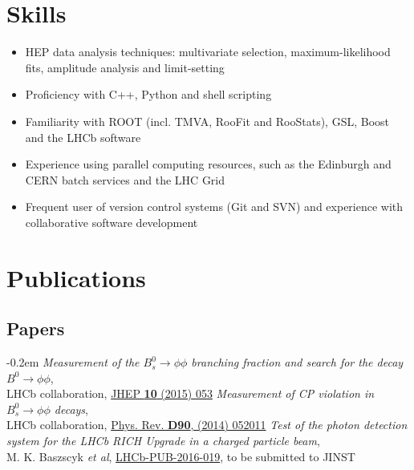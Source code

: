 \documentclass[contbibnum]{simplecv}
\renewcommand{\topicmargin}{8em}
\begin{document}
	\section{Skills}
	\begin{itemize}
		\itemsep-0.3em
		\item HEP data analysis techniques: multivariate selection, maximum-likelihood fits, amplitude analysis and limit-setting
		\item Proficiency with C++, Python and shell scripting
		\item Familiarity with ROOT (incl. TMVA, RooFit and RooStats), GSL, Boost and the LHCb software
		\item Experience using parallel computing resources, such as the Edinburgh and CERN batch services and the LHC Grid
		\item Frequent user of version control systems (Git and SVN) and experience with collaborative software development
	\end{itemize}
	\vspace{-1em}
	\section{Publications}
	\renewcommand{\topicmargin}{5em}
	\vspace{-0.5em}
	\subsection{Papers}
	\vspace{-0.5em}
	\begin{thebibliography}{1}
		\itemsep-0.2em
		\textit{Measurement of the $B^0_s \to \phi\phi$ branching fraction and search for the decay $B^0 \to \phi \phi$},\\LHCb collaboration, \href{http://dx.doi.org/10.1007/JHEP10(2015)053}{JHEP \textbf{10} (2015) 053}
		\textit{Measurement of CP violation in $B^0_s \to \phi\phi$ decays},\\LHCb collaboration, \href{http://dx.doi.org/10.1103/PhysRevD.90.052011}{Phys. Rev. \textbf{D90}, (2014) 052011}
		\textit{Test of the photon detection system for the LHCb RICH Upgrade in a charged particle beam},\\M. K. Baszscyk \textit{et al}, \href{http://cds.cern.ch/record/2197586}{LHCb-PUB-2016-019}, to be submitted to JINST
	\end{thebibliography}
	\vspace{-2em}
\end{document}
